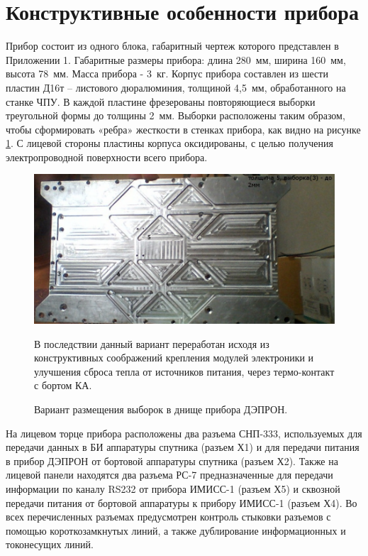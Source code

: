 \section{Конструктивные особенности прибора}

Прибор состоит из одного блока, габаритный чертеж которого представлен в Приложении 1. Габаритные размеры прибора: длина  280~мм, ширина 160~мм, высота 78~мм. Масса прибора - 3~кг. Корпус прибора составлен из шести пластин Д16т -- листового дюралюминия, толщиной 4,5~мм, обработанного на станке ЧПУ. В каждой пластине фрезерованы повторяющиеся выборки треугольной формы до толщины 2~мм. Выборки расположены таким образом, чтобы сформировать «ребра» жесткости в стенках прибора, как видно на рисунке \ref{fig:viborki}. С лицевой стороны пластины корпуса оксидированы, с целью получения электропроводной поверхности всего прибора.

\begin{figure}
\centering
\includegraphics[width=0.7\linewidth]{images/viborki1}
\caption{ Вариант размещения выборок в днище прибора ДЭПРОН.}
\medskip
{\small В последствии данный вариант переработан исходя из конструктивных соображений крепления модулей электроники и улучшения сброса тепла от источников питания, через термо-контакт с бортом КА. }
\label{fig:viborki}
\end{figure}


На лицевом торце прибора расположены два разъема СНП-333, используемых для передачи данных в БИ аппаратуры спутника (разъем Х1) и для передачи питания в прибор ДЭПРОН от бортовой аппаратуры спутника (разъем Х2). Также на лицевой панели находятся два разъема РС-7 предназначенные для передачи информации по каналу RS232 от прибора ИМИСС-1 (разъем Х5) и сквозной передачи питания от бортовой аппаратуры к прибору ИМИСС-1 (разъем Х4). Во всех перечисленных разъемах предусмотрен контроль стыковки разъемов с помощью короткозамкнутых линий, а также дублирование информационных и токонесущих линий.


